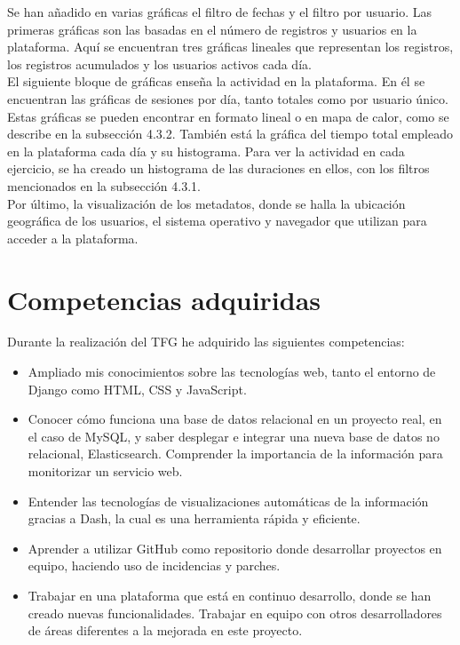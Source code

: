 Se han añadido en varias gráficas el filtro de fechas y el filtro por usuario. Las primeras gráficas son las basadas en el número de registros y usuarios en la plataforma. Aquí se encuentran tres gráficas lineales que representan los registros, los registros acumulados y los usuarios activos cada día. \\

El siguiente bloque de gráficas enseña la actividad en la plataforma. En él se encuentran las gráficas de sesiones por día, tanto totales como por usuario único. Estas gráficas se pueden encontrar en formato lineal o en mapa de calor, como se describe en la subsección 4.3.2. También está la gráfica del tiempo total empleado en la plataforma cada día y su histograma. Para ver la actividad en cada ejercicio, se ha creado un histograma de las duraciones en ellos, con los filtros mencionados en la subsección 4.3.1.  \\

Por último, la visualización de los metadatos, donde se halla la ubicación geográfica de los usuarios, el sistema operativo y navegador que utilizan para acceder a la plataforma.


	\section{Competencias adquiridas} 
	\label{sec:competencias_adquiridas} 
	Durante la realización del TFG he adquirido las siguientes competencias:
		
		\begin{itemize}
			\item Ampliado mis conocimientos sobre las tecnologías web, tanto el entorno de Django como HTML, CSS y JavaScript.
			\newpage
			\item Conocer cómo funciona una base de datos relacional en un proyecto real, en el caso de MySQL, y saber desplegar e integrar una nueva base de datos no relacional, Elasticsearch. Comprender la importancia de la información para monitorizar un servicio web. 
			
			\item Entender las tecnologías de visualizaciones automáticas de la información gracias a Dash, la cual es una herramienta rápida y eficiente.
			
			\item Aprender a utilizar GitHub como repositorio donde desarrollar proyectos en equipo, haciendo uso de incidencias y parches. 
			
			\item Trabajar en una plataforma que está en continuo desarrollo, donde se han creado nuevas funcionalidades. Trabajar en equipo con otros desarrolladores de áreas diferentes a la mejorada en este proyecto.			
		\end{itemize}
